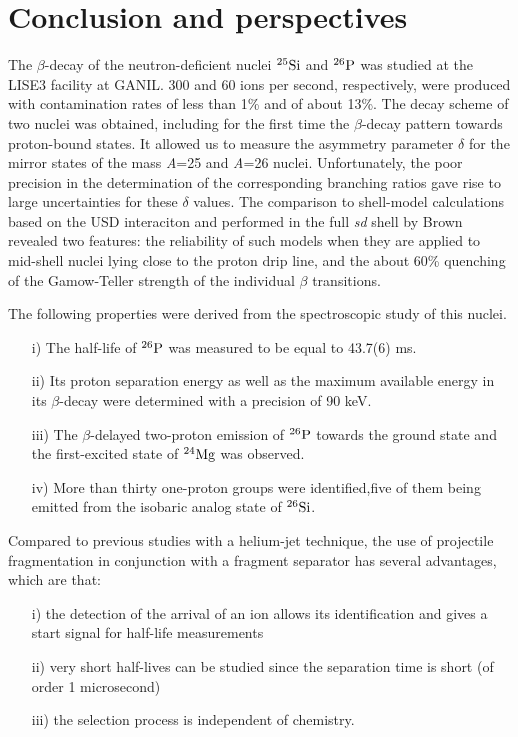 \documentclass[UTF8]{ctexart}
\begin{document}
\section{Conclusion and perspectives}
The $\beta$-decay of the neutron-deficient nuclei $^{25}\textnormal{Si}$ and $^{26}\textnormal{P}$ was studied at the LISE3 facility at GANIL. 300 and 60 ions per second, respectively, were produced with contamination rates of less than 1\% and of about 13\%. The decay scheme of two nuclei was obtained, including for the first
time the $\beta$-decay pattern towards proton-bound states. It allowed us to measure the asymmetry parameter $\delta$ for the mirror states of the mass \textit{A}=25 and \textit{A}=26 nuclei. Unfortunately, the poor precision in the determination of the corresponding branching ratios gave rise to large uncertainties for these $\delta$ values. The comparison to shell-model calculations based on the USD interaciton and performed in the full \textit{sd} shell by Brown revealed two features: the reliability of such models when they are applied to mid-shell nuclei lying close to the proton drip line, and the about 60\% quenching of the Gamow-Teller strength of the individual $\beta$ transitions.

The following properties were derived from the spectroscopic study of this nuclei.
\begin{itemize}
    \item[i)] The half-life of $^{26}\textnormal{P}$ was measured to be equal to 43.7(6) ms.
    \item[ii)] Its proton separation energy as well as the maximum available energy in its $\beta$-decay were determined with a precision of 90 keV. 
    \item[iii)] The $\beta$-delayed two-proton emission of $^{26}\textnormal{P}$ towards the ground state and the first-excited state of $^{24}\textnormal{Mg}$ was observed.
    \item[iv)] More than thirty one-proton groups were identified,five of them being emitted from the isobaric analog state of $^{26}\textnormal{Si}$.    
\end{itemize}

Compared to previous studies with a helium-jet technique, the use of projectile fragmentation in conjunction with a fragment separator has several advantages, which are that:
\begin{itemize}
    \item[i)] the detection of the arrival of an ion allows its identification and gives a start signal for half-life measurements
    \item[ii)] very short half-lives can be studied since the separation time is short (of order 1 microsecond)
    \item[iii)] the selection process is independent of chemistry. 
\end{itemize}
\end{document}
